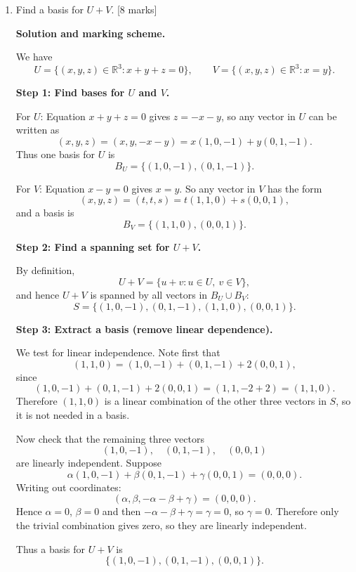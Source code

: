 \documentclass{article}
\begin{document}
\begin{enumerate}[label=(\alph*)]
    \item Find a basis for $U+V$. [8 marks]

    \begin{mdframed}[linecolor=black, linewidth=1pt]
    \textbf{Solution and marking scheme.}

    We have
    \[
    U = \{(x,y,z)\in\mathbb{R}^3 : x+y+z=0\},
    \qquad
    V = \{(x,y,z)\in\mathbb{R}^3 : x=y\}.
    \]
    
    \textbf{Step 1: Find bases for $U$ and $V$.}
    
    For $U$: Equation $x+y+z=0$ gives $z=-x-y$, so any vector in $U$ can be written as
    \[
    (x,y,z) = (x,y,-x-y) = x(1,0,-1) + y(0,1,-1).
    \]
    Thus one basis for $U$ is
    \[
    B_U = \{(1,0,-1),(0,1,-1)\}.
    \]
    
    For $V$: Equation $x-y=0$ gives $x=y$. So any vector in $V$ has the form
    \[
    (x,y,z) = (t,t,s) = t(1,1,0) + s(0,0,1),
    \]
    and a basis is
    \[
    B_V = \{(1,1,0),(0,0,1)\}.
    \]
    
    \textbf{Step 2: Find a spanning set for $U+V$.}
    
    By definition,
    \[
    U+V = \{u+v : u\in U,\ v\in V\},
    \]
    and hence $U+V$ is spanned by all vectors in $B_U\cup B_V$:
    \[
    S = \{(1,0,-1),(0,1,-1),(1,1,0),(0,0,1)\}.
    \]
    
    \textbf{Step 3: Extract a basis (remove linear dependence).}
    
    We test for linear independence. Note first that
    \[
    (1,1,0) = (1,0,-1) + (0,1,-1) + 2(0,0,1),
    \]
    since
    \[
    (1,0,-1) + (0,1,-1) + 2(0,0,1) = (1,1,-2+2) = (1,1,0).
    \]
    Therefore $(1,1,0)$ is a linear combination of the other three vectors in $S$, so it is not needed in a basis.
    
    Now check that the remaining three vectors
    \[
    (1,0,-1),\quad (0,1,-1),\quad (0,0,1)
    \]
    are linearly independent. Suppose
    \[
    \alpha(1,0,-1) + \beta(0,1,-1) + \gamma(0,0,1) = (0,0,0).
    \]
    Writing out coordinates:
    \[
    (\alpha, \beta, -\alpha-\beta+\gamma) = (0,0,0).
    \]
    Hence $\alpha=0$, $\beta=0$ and then $-\alpha-\beta+\gamma = \gamma = 0$, so $\gamma=0$. Therefore only the trivial combination gives zero, so they are linearly independent.
    
    Thus a basis for $U+V$ is
    \[
    \{(1,0,-1),(0,1,-1),(0,0,1)\}.
    \]
    

\end{mdframed}
\end{enumerate}
\end{document}
